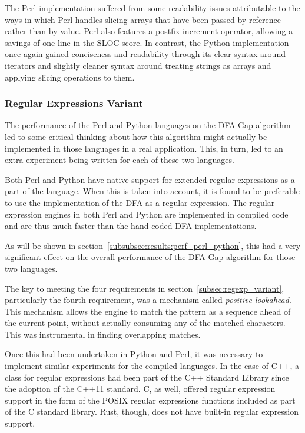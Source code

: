 The Perl implementation suffered from some readability issues attributable to the ways in which Perl handles slicing arrays that have been passed by reference rather than by value. Perl also features a postfix-increment operator, allowing a savings of one line in the SLOC score. In contrast, the Python implementation once again gained conciseness and readability through its clear syntax around iterators and slightly cleaner syntax around treating strings as arrays and applying slicing operations to them.

\subsubsection{Regular Expressions Variant}
\label{subsubsec:dfa_regexp}

The performance of the Perl and Python languages on the DFA-Gap algorithm led to some critical thinking about how this algorithm might actually be implemented in those languages in a real application. This, in turn, led to an extra experiment being written for each of these two languages.

Both Perl and Python have native support for extended regular expressions as a part of the language. When this is taken into account, it is found to be preferable to use the implementation of the DFA as a regular expression. The regular expression engines in both Perl and Python are implemented in compiled code and are thus much faster than the hand-coded DFA implementations.

As will be shown in section~\ref{subsubsec:results:perf_perl_python}, this had a very significant effect on the overall performance of the DFA-Gap algorithm for those two languages.

The key to meeting the four requirements in section~\ref{subsec:regexp_variant}, particularly the fourth requirement, was a mechanism called \textit{positive-lookahead}. This mechanism allows the engine to match the pattern as a sequence ahead of the current point, without actually consuming any of the matched characters. This was instrumental in finding overlapping matches.

Once this had been undertaken in Python and Perl, it was necessary to implement similar experiments for the compiled languages. In the case of C++, a class for regular expressions had been part of the C++ Standard Library since the adoption of the C++11 standard. C, as well, offered regular expression support in the form of the POSIX regular expressions functions included as part of the C standard library. Rust, though, does not have built-in regular expression support.

